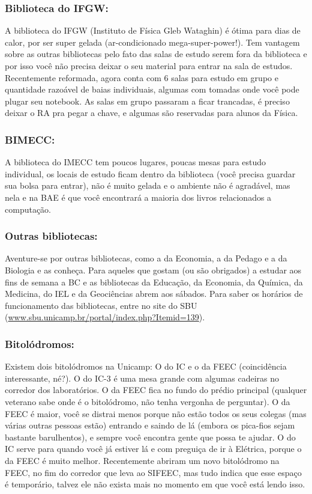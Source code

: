 \subsubsection{Biblioteca do IFGW:} A biblioteca do IFGW (Instituto de Física
Gleb Wataghin) é ótima para dias de calor, por ser super gelada (ar-condicionado
mega-super-power!). Tem vantagem sobre as outras bibliotecas pelo fato das salas
de estudo serem fora da biblioteca e por isso você não precisa deixar o seu
material para entrar na sala de estudos. Recentemente reformada, agora conta com
6 salas para estudo em grupo e quantidade razoável de baias individuais, algumas
com tomadas onde você pode plugar seu notebook. As salas em grupo passaram a
ficar trancadas, é preciso deixar o RA pra pegar a chave, e algumas são
reservadas para alunos da Física.

\subsubsection{BIMECC:} A biblioteca do IMECC tem poucos lugares, poucas mesas
para estudo individual, os locais de estudo ficam dentro da biblioteca (você
precisa guardar sua bolsa para entrar), não é muito gelada e o ambiente não é
agradável, mas nela e na BAE é que você encontrará a maioria dos livros
relacionados a computação.

\subsubsection{Outras bibliotecas:} Aventure-se por outras bibliotecas, como a
da Economia, a da Pedago e a da Biologia e as conheça. Para aqueles que gostam
(ou são obrigados) a estudar aos fins de semana a BC e as bibliotecas da
Educação, da Economia, da Química, da Medicina, do IEL e da Geociências abrem
aos sábados. Para saber os horários de funcionamento das bibliotecas, entre no
site do SBU (\url{www.sbu.unicamp.br/portal/index.php?Itemid=139}).

\subsubsection{Bitolódromos:} Existem dois bitolódromos na Unicamp: O do IC e o
da FEEC (coincidência interessante, né?). O do IC-3 é uma mesa grande com
algumas cadeiras no corredor dos laboratórios. O da FEEC fica no fundo do prédio
principal (qualquer veterano sabe onde é o bitolódromo, não tenha vergonha de
perguntar). O da FEEC é maior, você se distrai menos porque não estão todos os
seus colegas (mas várias outras pessoas estão) entrando e saindo de lá (embora
os pica-fios sejam bastante barulhentos), e sempre você encontra gente que possa
te ajudar.  O do IC serve para quando você já estiver lá e com preguiça de ir à
Elétrica, porque o da FEEC é muito melhor. Recentemente abriram um novo
bitolódromo na FEEC, no fim do corredor que leva ao SIFEEC, mas tudo indica que
esse espaço é temporário, talvez ele não exista mais no momento em que você está
lendo isso.

